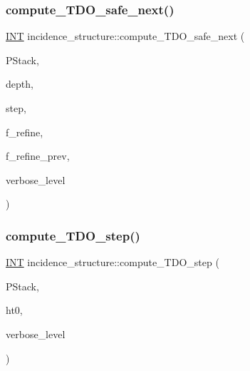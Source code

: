 \mbox{\label{classincidence__structure_a7c315a348fc6bed0f8642767cc9cd7d1}} 
\subsubsection{\texorpdfstring{compute\+\_\+\+T\+D\+O\+\_\+safe\+\_\+next()}{compute\_TDO\_safe\_next()}}
{\footnotesize\ttfamily \mbox{\hyperlink{galois_8h_a09fddde158a3a20bd2dcadb609de11dc}{I\+NT}} incidence\+\_\+structure\+::compute\+\_\+\+T\+D\+O\+\_\+safe\+\_\+next (\begin{DoxyParamCaption}\item[{\mbox{\hyperlink{classpartitionstack}{partitionstack}} \&}]{P\+Stack,  }\item[{\mbox{\hyperlink{galois_8h_a09fddde158a3a20bd2dcadb609de11dc}{I\+NT}}}]{depth,  }\item[{\mbox{\hyperlink{galois_8h_a09fddde158a3a20bd2dcadb609de11dc}{I\+NT}} \&}]{step,  }\item[{\mbox{\hyperlink{galois_8h_a09fddde158a3a20bd2dcadb609de11dc}{I\+NT}} \&}]{f\+\_\+refine,  }\item[{\mbox{\hyperlink{galois_8h_a09fddde158a3a20bd2dcadb609de11dc}{I\+NT}} \&}]{f\+\_\+refine\+\_\+prev,  }\item[{\mbox{\hyperlink{galois_8h_a09fddde158a3a20bd2dcadb609de11dc}{I\+NT}}}]{verbose\+\_\+level }\end{DoxyParamCaption})}

\mbox{\label{classincidence__structure_a6175accaa64033df34d722c594a8b827}} 
\subsubsection{\texorpdfstring{compute\+\_\+\+T\+D\+O\+\_\+step()}{compute\_TDO\_step()}}
{\footnotesize\ttfamily \mbox{\hyperlink{galois_8h_a09fddde158a3a20bd2dcadb609de11dc}{I\+NT}} incidence\+\_\+structure\+::compute\+\_\+\+T\+D\+O\+\_\+step (\begin{DoxyParamCaption}\item[{\mbox{\hyperlink{classpartitionstack}{partitionstack}} \&}]{P\+Stack,  }\item[{\mbox{\hyperlink{galois_8h_a09fddde158a3a20bd2dcadb609de11dc}{I\+NT}}}]{ht0,  }\item[{\mbox{\hyperlink{galois_8h_a09fddde158a3a20bd2dcadb609de11dc}{I\+NT}}}]{verbose\+\_\+level }\end{DoxyParamCaption})}

